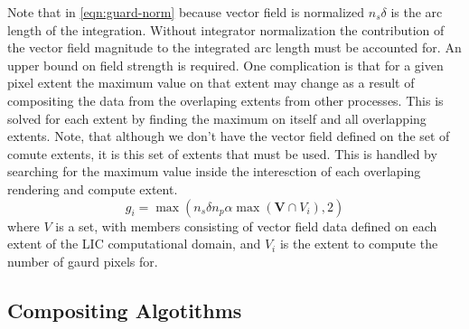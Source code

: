 \documentclass[a4paper,10pt]{article}
\begin{document}
Note that in \ref{eqn:guard-norm} because vector field is normalized $n_s \delta$ is the arc length of the integration. Without integrator normalization the contribution of the vector field magnitude to the integrated arc length must be accounted for. An upper bound on field strength is required. One complication is that for a given pixel extent the maximum value on that extent may change as a result of compositing the data from the overlaping extents from other processes. This is solved for each extent by finding the maximum on itself and all overlapping extents. Note, that although we don't have the vector field defined on the set of comute extents, it is this set of extents that must be used. This is handled by searching for the maximum value inside the interesction of each overlaping rendering and compute extent.
\begin{equation}
g_i = \max(n_s \delta n_p \alpha \max(\mathbf{V} \cap V_i), 2)
\label{eqn:gaurd}
\end{equation}
where $V$ is a set, with members consisting of vector field data defined on each extent of the LIC computational domain, and $V_i$ is the extent to compute the number of gaurd pixels for.



\subsection{Compositing Algotithms}
\end{document}
